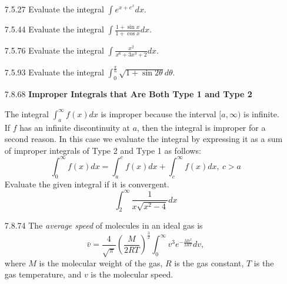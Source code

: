 \documentclass{article}
\begin{document}
\begin{enumerate}
    (a) $\displaystyle \int e^{x} \sqrt{e^{x}-1}dx$
    \hspace{1cm}
    (b) $\displaystyle \int \frac{e^{x}}{\sqrt{1-e^{2x}}}dx$
    \hspace{1cm}
    (c) $\displaystyle \int \frac{1}{\sqrt{e^{x}-1}}dx$

\vspace{6cm}

\item[7.5.27]
    Evaluate the integral $\displaystyle \int e^{x+e^{x}}dx$.

\vspace{6cm}

\item[7.5.44]
    Evaluate the integral $\displaystyle \int \frac{1+\sin x}{1+\cos x}dx$.

\newpage

\item[7.5.76]
    Evaluate the integral $\displaystyle \int \frac{x^{2}}{x^{6}+3x^{3}+2}dx$.

\vspace{5cm}

\item[7.5.93]
    Evaluate the integral
    $\displaystyle \int_{0}^{\frac{\pi}{6}}  \sqrt{1 + \sin 2\theta}d\theta$.

\vspace{5cm}

\item[7.8.68]
    \textbf{Improper Integrals that Are Both Type 1 and Type 2}

    The integral $\displaystyle \int_{a}^{\infty} f(x) dx $ is improper because
    the interval $[a, \infty)$ is infinite. If $f$ has an infinite
    discontinuity at $a$, then the integral is improper for a second
    reason. In this case we evaluate the integral by expressing it as a sum
    of improper integrals of Type 2 and Type 1 as follows:
    \[
        \int_{0}^{\infty} f(x) dx
        = \int_{a}^{c} f(x)dx + \int_{c}^{\infty} f(x)dx,\ c > a
    \]
    Evaluate the given integral if it is convergent.
    \[
        \int_{2}^{\infty} \frac{1}{x \sqrt{x^{2}-4}}dx
    \]

\newpage

\item[7.8.74]
    The \textit{average speed} of molecules in an ideal gas is
    \[
        \bar{v} = \frac{4}{\sqrt{\pi}} \left( \frac{M}{2RT} \right)^{\frac{3}{2}}
        \int_{0}^{\infty} v^{3}e^{-\frac{Mv^{2}}{2RT}} dv,
    \]
    where $M$ is the molecular weight of the gas, $R$ is the gas constant,
    $T$ is the gas temperature, and $v$ is the molecular speed.


\end{enumerate}
\end{document}
